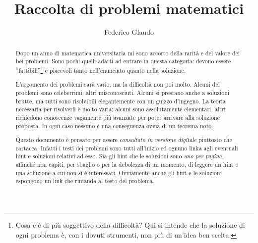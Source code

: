 \documentclass[a4paper,12pt]{article}
\title{Raccolta di problemi matematici}
\author{Federico Glaudo}
\newcounter{ProblemNumber}
\begin{document}
\maketitle

\begin{abstract}
	Dopo un anno di matematica universitaria mi sono accorto della rarità e del valore dei bei problemi. Sono pochi quelli adatti ad entrare in questa categoria: devono essere ``fattibili''\footnote{Cosa c'è di più soggettivo della difficoltà? Qui si intende che la soluzione di ogni problema è, con i dovuti strumenti, non più di un'idea ben scelta.} e piacevoli tanto nell'enunciato quanto nella soluzione.
	
	L'argomento dei problemi sarà vario, ma la difficoltà non poi molto. Alcuni dei problemi sono celeberrimi, altri misconosciuti. Alcuni si prestano anche a soluzioni brutte, ma tutti sono risolvibili elegantemente con un guizzo d'ingegno.
	La teoria necessaria per risolverli è molto varia: alcuni sono assolutamente elementari, altri richiedono conoscenze vagamente più avanzate per poter arrivare alla soluzione proposta. In ogni caso nessuno è una conseguenza ovvia di un teorema noto.

	Questo documento è pensato per essere \emph{consultato in versione digitale} piuttosto che cartacea. 
	Infatti i testi dei problemi sono tutti all'inizio ed ognuno linka agli eventuali hint e soluzioni relativi ad esso. Sia gli hint che le soluzioni sono \emph{uno per pagina}, affinché non capiti, per sbaglio o per la debolezza di un momento, di leggere un hint o una soluzione a cui non si è interessati. Ovviamente anche gli hint e le soluzioni espongono un link che rimanda al testo del problema. 
	
\end{abstract}
\clearpage

\tableofcontents
\clearpage





%
\addtocounter{ProblemNumber}{1}%
%
%
%
\end{document}
